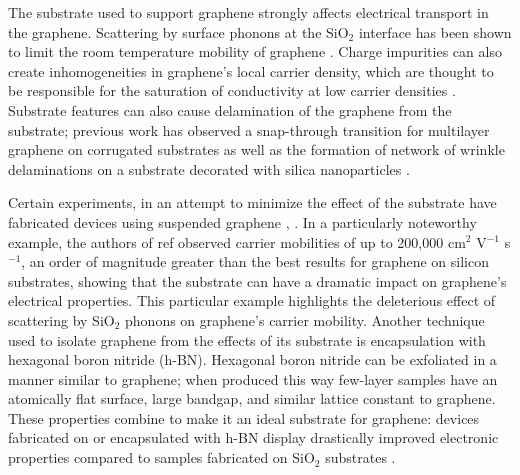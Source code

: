\documentclass[edeposit,fullpage,draftthesis]{uiucthesis2009}
\begin{document}
        The substrate used to support graphene strongly affects electrical transport in the graphene. 
        Scattering by surface phonons at the SiO$_2$ interface has been shown to limit the room 
        temperature mobility of graphene \cite{Chen2008}.
        Charge impurities can also create inhomogeneities in graphene's local carrier density, 
        which are thought to be responsible for the saturation of conductivity at low carrier 
        densities \cite{Hwang2007}. Substrate features can also cause delamination of the graphene 
        from the substrate; previous work has observed a snap-through transition for multilayer 
        graphene on corrugated substrates \cite{Scharfenberg2012} as well as the formation of 
        network of wrinkle delaminations on a substrate decorated with silica nanoparticles \cite{Yamamoto2012}.
    
        Certain experiments, in an attempt to minimize the effect of the substrate have fabricated 
        devices using suspended graphene \cite{bolotin2008ultrahigh}, \cite{Du2008}. In a particularly noteworthy 
        example, the authors of ref \cite{bolotin2008ultrahigh} observed carrier mobilities of up 
        to 200,000 cm$^2$ V$^{-1}$ s$^{-1}$, an order of magnitude greater than the best results for 
        graphene on silicon substrates, showing that the substrate can have a dramatic impact on 
        graphene's electrical properties. This particular example highlights the deleterious effect
        of scattering by SiO$_2$ phonons on graphene's carrier mobility.
        Another technique used to isolate graphene from the effects of its substrate is encapsulation
        with hexagonal boron nitride (h-BN). 
        Hexagonal boron nitride can be exfoliated in a manner similar to graphene; when produced this 
        way few-layer samples have an atomically flat surface, large 
        bandgap, and similar lattice constant to graphene. These properties combine to make it
        an ideal substrate for graphene:
        devices fabricated on or encapsulated with h-BN display drastically improved electronic 
        properties compared to samples fabricated on SiO$_2$ substrates \cite{Dean2010, Xue2011}.
       
        
       
        
\end{document}
